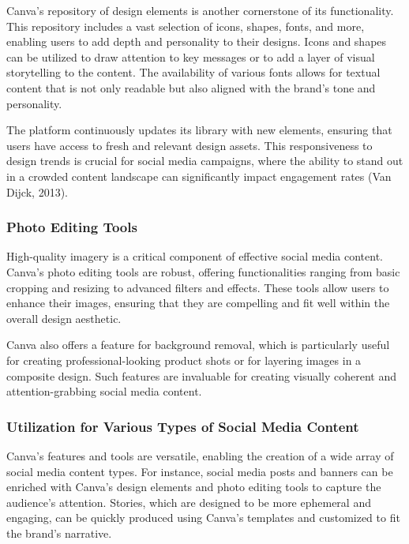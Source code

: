 \documentclass[
]{book}
\begin{document}
Canva's repository of design elements is another cornerstone of its functionality. This repository includes a vast selection of icons, shapes, fonts, and more, enabling users to add depth and personality to their designs. Icons and shapes can be utilized to draw attention to key messages or to add a layer of visual storytelling to the content. The availability of various fonts allows for textual content that is not only readable but also aligned with the brand's tone and personality.

The platform continuously updates its library with new elements, ensuring that users have access to fresh and relevant design assets. This responsiveness to design trends is crucial for social media campaigns, where the ability to stand out in a crowded content landscape can significantly impact engagement rates (Van Dijck, 2013).

\hypertarget{photo-editing-tools}{%
\subsubsection*{Photo Editing Tools}\label{photo-editing-tools}}

High-quality imagery is a critical component of effective social media content. Canva's photo editing tools are robust, offering functionalities ranging from basic cropping and resizing to advanced filters and effects. These tools allow users to enhance their images, ensuring that they are compelling and fit well within the overall design aesthetic.

Canva also offers a feature for background removal, which is particularly useful for creating professional-looking product shots or for layering images in a composite design. Such features are invaluable for creating visually coherent and attention-grabbing social media content.

\hypertarget{utilization-for-various-types-of-social-media-content}{%
\subsubsection*{Utilization for Various Types of Social Media Content}\label{utilization-for-various-types-of-social-media-content}}

Canva's features and tools are versatile, enabling the creation of a wide array of social media content types. For instance, social media posts and banners can be enriched with Canva's design elements and photo editing tools to capture the audience's attention. Stories, which are designed to be more ephemeral and engaging, can be quickly produced using Canva's templates and customized to fit the brand's narrative.
\end{document}
